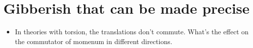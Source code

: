 \documentclass{report}
\begin{document}
\chapter{Gibberish that can be made precise}

\begin{itemize}
  \item In theories with torsion, the translations don't commute. What's the effect on the commutator of momenum in different directions.

\end{itemize}
\end{document}
